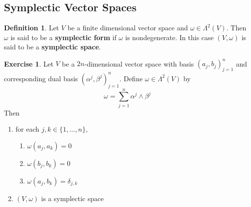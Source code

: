\documentclass{book}
\theoremstyle{definition}
\newtheorem{defn}[definition]{Definition}
\newtheorem{ex}[definition]{Exercise}
\newcommand{\al}{\alpha}
\newcommand{\be}{\beta}
\newcommand{\del}{\delta}
\newcommand{\om}{\omega}
\newcommand{\Lam}{\Lambda}
\DeclareMathOperator*{\0}{\mbf{0}}
\DeclareMathOperator*{\1}{\mbf{1}}
\newcommand{\tbf}[1]{\textbf{#1}}
\begin{document}
	
	
	
	
	
	
	
	
	
	
	
	
	
	
	
	
	
	
	
	
	
	
	
	
	
	
	
	
	
	
	
	
	
	
	
	
	
	
	\subsection{Symplectic Vector Spaces}
	
	\begin{defn}
		Let $V$ be a finite dimensional vector space and $\om \in \Lam^2(V)$. Then $\om$ is said to be a \tbf{symplectic form} if $\om$ is nondegenerate. In this case $(V, \om)$ is said to be a \tbf{symplectic space}.
	\end{defn}
	
	\begin{ex}
		Let $V$ be a $2n$-dimensional vector space with basis $(a_j, b_j)_{j=1}^n$ and corresponding dual basis $(\al^j, \be^j)_{j=1}^n$. Define $\om \in \Lam^2(V)$ by 
		$$\om = \sum_{j=1}^n \al^j \wedge \be^j$$
		Then 
		\begin{enumerate}
			\item for each $j,k \in \{1, \ldots, n\}$, 
			\begin{enumerate}
				\item $\om(a_j, a_k) = 0$
				\item $\om(b_j, b_k) = 0$
				\item $\om(a_j, b_k) = \del_{j,k}$
			\end{enumerate}
			\item $(V, \om)$ is a symplectic space
		\end{enumerate}
	\end{ex}
	
\end{document}
